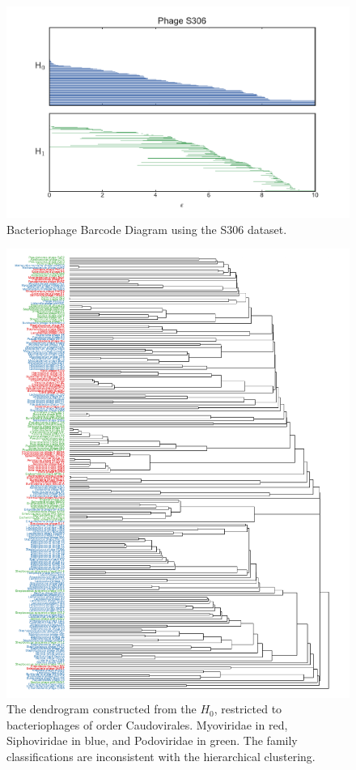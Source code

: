 \begin{figure}
\centering
\includegraphics[]{./fig/phage/phage_s306_barcode.pdf}
\caption[Bacteriophage Barcode Diagram]{Bacteriophage Barcode Diagram using the S306 dataset.}
\label{phage:fig:barcode}
\end{figure}

\begin{figure}
\centering
\includegraphics[]{fig/phage/phage_s306_caudosubset_dendrogram.pdf}
\caption[Caudovirales $H_0$ dendrogram]{The dendrogram constructed from the $H_0$, restricted to bacteriophages of order Caudovirales. Myoviridae in red, Siphoviridae in blue, and Podoviridae in green. The family classifications are inconsistent with the hierarchical clustering.}
\label{phage:fig:caudosubset_dendrogram}
\end{figure}

